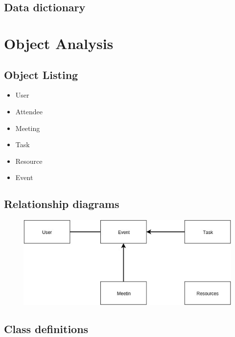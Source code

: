 \subsection{Data dictionary}


\section{Object Analysis}

\subsection{Object Listing}

\begin{itemize}
	\item User
	\item Attendee
	\item Meeting
	\item Task
	\item Resource
	\item Event
\end{itemize}

\subsection{Relationship diagrams}

\begin{figure}[H]
	\includegraphics[width=\textwidth]{./Analysis/diagrams/orld.jpg}
\end{figure}

\subsection{Class definitions}

